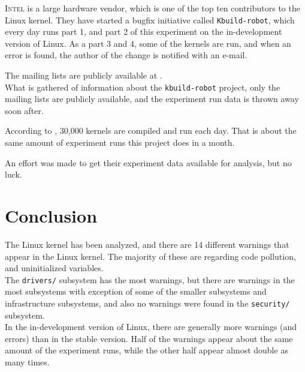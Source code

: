 \documentclass[a4paper,11pt]{report}
\begin{document}
\textsc{Intel} is a large hardware vendor, which is one of the top ten 
contributors to the Linux kernel\cite{gkh}. They have started a bugfix 
initiative called \texttt{Kbuild-robot}, which every day runs part 1, and part 
2 of this experiment on the in-development version of Linux. As a part 3 and 4, 
some of the kernels are run, and when an error is found, the author of the change 
is notified with an e-mail.

The mailing lists are publicly available at 
\cite{kbuildrobot,kbuildrobotall,kbuildlkp}.
\\

What is gathered of information about the \texttt{kbuild-robot} project, only 
the mailing lists are publicly available, and the experiment run data is thrown 
away soon after. 

According to \cite{summit2012,summit2013}, 30,000 kernels are compiled and run
each day. That is about the same amount of experiment runs this project does in 
a month.

An effort was made to get their experiment data available for analysis, but no 
luck.  

            \newpage
            \chapter{Conclusion}
The Linux kernel has been analyzed, and there are 14 different 
warnings that appear in the Linux kernel. The majority of these are regarding 
code pollution, and uninitialized variables.
\\

The \texttt{drivers/} subsystem has the most warnings, but there are warnings 
in the most subsystems with exception of some of the smaller subsystems and 
infrastructure subsystems, and also no warnings were found in the 
\texttt{security/} subsystem.
\\

In the in-development version of Linux, there are generally more warnings (and
errors) than in the stable version. Half of the warnings appear about the same
amount of the experiment runs, while the other half appear almost double as 
many times.
\end{document}
